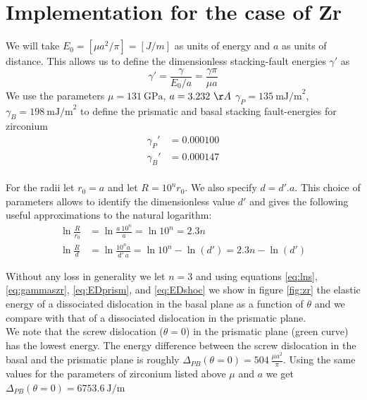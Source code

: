 \documentclass[10pt,a4paper,final]{article}
\begin{document}
\section{Implementation for the case of Zr}
We will take $E_0 = [\mu a^2/\pi] = [J/m]$ as units of energy and $a$ as units of distance. This allows us to define the dimensionless stacking-fault energies $\gamma'$ as 
\begin{equation}
\gamma' = \frac{\gamma}{E_0/a} = \frac{\gamma\pi}{\mu a} \label{eq:dimgamma} 
\end{equation}
We use the parameters $\mu=131~\text{GPa}$, $a=3.232~\AA$ $\gamma_P=135 ~\text{mJ/m}^2$, $\gamma_B = 198 ~\text{mJ/m}^2$ to define the prismatic and basal stacking fault-energies for zirconium
\begin{equation}
\begin{split}
\gamma_P' &= 0.000100 \\
\gamma_B' &= 0.000147
\end{split}
\label{eq:gammaszr}
\end{equation}\\

For the radii let $r_0=a$ and let $R=10^nr_0$. We also specify $d = d'.a$. This choice of parameters allows to identify the dimensionless value $d'$ and gives the following useful approximations to the natural logarithm:
\begin{equation}
\begin{split}
\ln\frac{R}{r_0} &= \ln\frac{a~10^n}{a} = \ln10^n = 2.3n \\
\ln\frac{R}{d} &= \ln\frac{10^na}{d'~a} = \ln10^n - \ln(d') = 2.3n - \ln(d')
\end{split}
\label{eq:lns}
\end{equation}

Without any loss in generality we let $n=3$ and using equations \ref{eq:lns}, \ref{eq:gammaszr}, \ref{eq:EDprism}, and \ref{eq:EDshoc} we show in figure \ref{fig:zr} the elastic energy of a dissociated dislocation in the basal plane as a function of $\theta$ and we compare with that of a dissociated dislocation in the prismatic plane.\\

We note that the screw dislocation ($\theta=0$) in the prismatic plane (green curve) has the lowest energy. The energy difference between the screw dislocation in the basal and the prismatic plane is roughly $\Delta_{PB}(\theta=0) = 504 ~\frac{\mu a^2}{\pi}$. Using the same values for the parameters of zirconium listed above $\mu$ and $a$ we get $\Delta_{PB}(\theta=0) = 6753.6~\text{J/m}$
\end{document}
